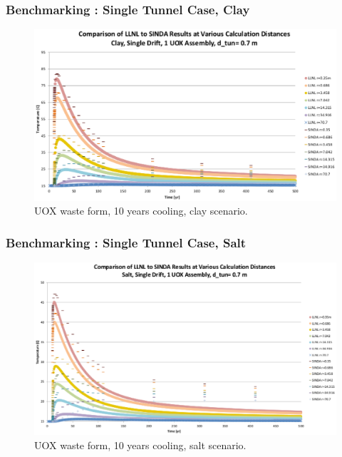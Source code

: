 \begin{frame}
  \frametitle{Benchmarking : Single Tunnel Case, Clay}
    \begin{figure}[h]
      \begin{center}
        \includegraphics[width=\textwidth]{1Drift1UOXWFLLNL_Clay10yr.eps}
      \end{center}
      \caption{UOX waste form, 10 years cooling, clay scenario.}
      \label{fig:10clay}
    \end{figure}
\end{frame}

\begin{frame}
  \frametitle{Benchmarking : Single Tunnel Case, Salt}
    \begin{figure}[h]
      \begin{center}
        \includegraphics[width=\textwidth]{1Drift1UOXWFLLNL_Salt10yr.eps}
      \end{center}
      \caption{UOX waste form, 10 years cooling, salt scenario.}
      \label{fig:10salt}
    \end{figure}
\end{frame}


